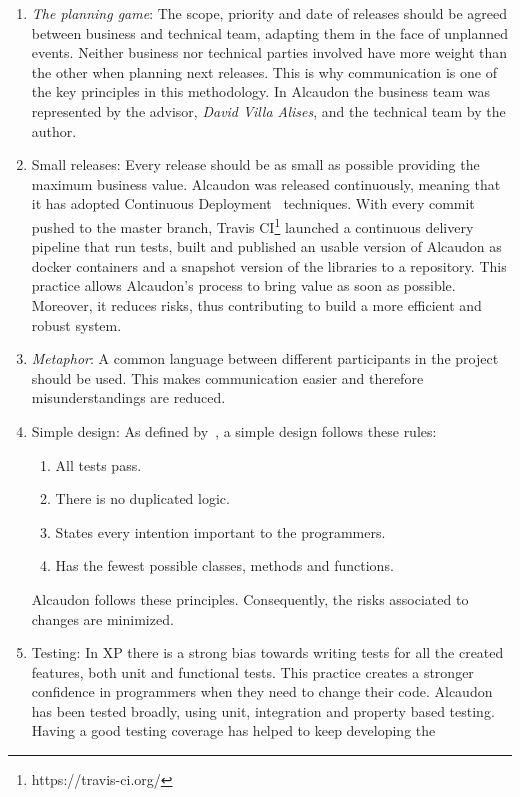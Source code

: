 \begin{enumerate}
\item \textit{The planning game}: The scope, priority and date of releases
  should be agreed between business and technical team, adapting them in the
  face of unplanned events. Neither business nor technical parties involved have
  more weight than the other when planning next releases. This is why
  communication is one of the key principles in this methodology. In Alcaudon
  the business team was represented by the advisor, \textit{David Villa Alises},
  and the technical team by the author.
\item Small releases: Every release should be as small as possible providing the
  maximum business value. Alcaudon was released continuously, meaning that it
  has adopted Continuous Deployment~\cite{cd} techniques. With every commit
  pushed to the master branch, Travis CI\footnote{https://travis-ci.org/}
  launched a continuous delivery pipeline that run tests, built and published
  an usable version of Alcaudon as docker containers and a snapshot version of
  the libraries to a repository. This practice allows Alcaudon's process to
  bring value as soon as possible. Moreover, it reduces risks, thus contributing
  to build a more efficient and robust system.
\item \textit{Metaphor}: A common language between different participants in the
  project should be used. This makes communication easier and therefore
  misunderstandings are reduced.
\item Simple design: As defined by~\cite{xp}, a simple design follows these rules:
  \begin{enumerate}
  \item All tests pass.
  \item There is no duplicated logic.
  \item States every intention important to the programmers.
  \item Has the fewest possible classes, methods and functions.
  \end{enumerate}
  Alcaudon follows these principles. Consequently, the risks associated to
  changes are minimized.
\item Testing: In \acs{XP} there is a strong bias towards writing tests for all the
  created features, both unit and functional tests. This practice creates
  a stronger confidence in programmers when they need to change their code.
  Alcaudon has been tested broadly, using unit, integration and property based
  testing. Having a good testing coverage has helped to keep developing the

\end{enumerate}
